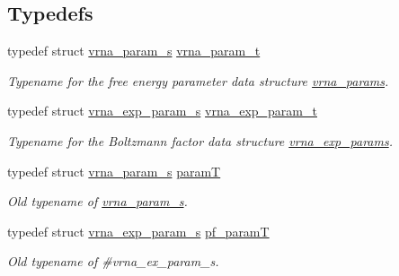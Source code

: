 \subsection*{Typedefs}
\begin{DoxyCompactItemize}
\item 
\hypertarget{group__energy__parameters_ga8a69ca7d787e4fd6079914f5343a1f35}{}typedef struct \hyperlink{group__energy__parameters_structvrna__param__s}{vrna\+\_\+param\+\_\+s} \hyperlink{group__energy__parameters_ga8a69ca7d787e4fd6079914f5343a1f35}{vrna\+\_\+param\+\_\+t}\label{group__energy__parameters_ga8a69ca7d787e4fd6079914f5343a1f35}

\begin{DoxyCompactList}\small\item\em Typename for the free energy parameter data structure \hyperlink{group__energy__parameters_gad0e3e7e74bdc50d1709d40c92993185e}{vrna\+\_\+params}. \end{DoxyCompactList}\item 
\hypertarget{group__energy__parameters_ga01d8b92fe734df8d79a6169482c7d8d8}{}typedef struct \hyperlink{group__energy__parameters_structvrna__exp__param__s}{vrna\+\_\+exp\+\_\+param\+\_\+s} \hyperlink{group__energy__parameters_ga01d8b92fe734df8d79a6169482c7d8d8}{vrna\+\_\+exp\+\_\+param\+\_\+t}\label{group__energy__parameters_ga01d8b92fe734df8d79a6169482c7d8d8}

\begin{DoxyCompactList}\small\item\em Typename for the Boltzmann factor data structure \hyperlink{group__energy__parameters_gab1f3016f96aa96bff020cdd904605afa}{vrna\+\_\+exp\+\_\+params}. \end{DoxyCompactList}\item 
typedef struct \hyperlink{group__energy__parameters_structvrna__param__s}{vrna\+\_\+param\+\_\+s} \hyperlink{group__energy__parameters_ga857dde86357d306cc902f0d8b2797659}{param\+T}
\begin{DoxyCompactList}\small\item\em Old typename of \hyperlink{group__energy__parameters_structvrna__param__s}{vrna\+\_\+param\+\_\+s}. \end{DoxyCompactList}\item 
typedef struct \hyperlink{group__energy__parameters_structvrna__exp__param__s}{vrna\+\_\+exp\+\_\+param\+\_\+s} \hyperlink{group__energy__parameters_ga8bffe1828e2cbec101769f5cc0b1535b}{pf\+\_\+param\+T}
\begin{DoxyCompactList}\small\item\em Old typename of \#vrna\+\_\+ex\+\_\+param\+\_\+s. \end{DoxyCompactList}\end{DoxyCompactItemize}
